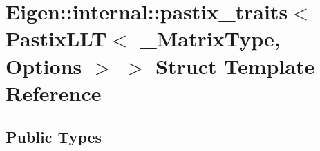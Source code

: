 \hypertarget{struct_eigen_1_1internal_1_1pastix__traits_3_01_pastix_l_l_t_3_01___matrix_type_00_01_options_01_4_01_4}{}\section{Eigen\+:\+:internal\+:\+:pastix\+\_\+traits$<$ Pastix\+L\+LT$<$ \+\_\+\+Matrix\+Type, Options $>$ $>$ Struct Template Reference}
\label{struct_eigen_1_1internal_1_1pastix__traits_3_01_pastix_l_l_t_3_01___matrix_type_00_01_options_01_4_01_4}
\subsection*{Public Types}
